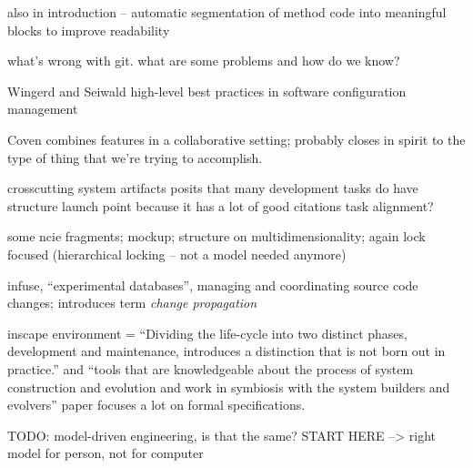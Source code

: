 \documentclass[conference]{IEEEtran}
\begin{document}
also in introduction -- automatic segmentation of method code into
meaningful blocks to improve readability 

what's wrong with git. what are some problems and how do we know?~\cite{PerezDeRosso2013}

Wingerd and Seiwald
high-level best practices in software configuration management~\cite{Wingerd1998}

Coven combines features in a collaborative setting; probably closes in spirit to the type of thing that we're trying to accomplish.~\cite{Chu-Carroll2000}

crosscutting system artifacts
posits that many development tasks do have structure
launch point because it has a lot of good citations
task alignment?~\cite{Murphy2005}

some ncie fragments; mockup; structure on multidimensionality; again lock focused (hierarchical locking -- not a model needed anymore)
~\cite{Chu-Carroll2003}

infuse, ``experimental databases'', managing and coordinating source code changes; introduces term \emph{change propagation}~\cite{Perry1987}

inscape environment = ``Dividing the life-cycle into two distinct phases, development and maintenance, introduces a distinction that is not born out in practice.'' and ``tools that are knowledgeable about the process of system construction and evolution and work in symbiosis with the system builders and evolvers'' paper focuses a lot on formal specifications.~\cite{Perry1989}






TODO: model-driven engineering, is that the same? START HERE
 --> right model for person, not for computer

\end{document}
